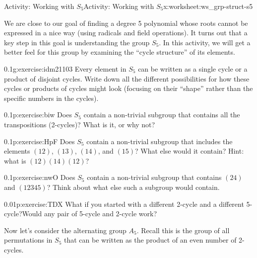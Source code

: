 \documentclass[11pt]{book}
\begin{document}
%
%
\typeout{************************************************}
\typeout{************************************************}
%
\begin{worksheet-subsection}{Activity: Working with \(S_5\)}{}{Activity: Working with \(S_5\)}{}{}{x:worksheet:ws_grp-struct-s5}
\begin{introduction}{}%
We are close to our goal of finding a degree 5 polynomial whose roots cannot be expressed in a nice way (using radicals and field operations).  It turns out that a key step in this goal is understanding the group \(S_5\).  In this activity, we will get a better feel for this group by examining the ``cycle structure'' of its elements.%
\end{introduction}%
\begin{divisionexercise}{1}{}{0.1}{g:exercise:idm21103}%
Every element in \(S_5\) can be written as a single cycle or a product of disjoint cycles.  Write down all the different possibilities for how these cycles or products of cycles might look (focusing on their ``shape'' rather than the specific numbers in the cycles).%
\end{divisionexercise}%
\begin{divisionexercise}{2}{}{0.1}{p:exercise:biw}%
Does \(S_5\) contain a non-trivial subgroup that contains all the transpositions (2-cycles)?  What is it, or why not?%
\end{divisionexercise}%
\begin{divisionexercise}{3}{}{0.1}{p:exercise:HpF}%
Does \(S_5\) contain a non-trivial subgroup that includes the elements \((12)\), \((13)\), \((14)\), and \((15)\)?  What else would it contain?  Hint: what is \((12)(14)(12)\)?%
\end{divisionexercise}%
\begin{divisionexercise}{4}{}{0.1}{p:exercise:nwO}%
Does \(S_5\) contain a non-trivial subgroup that contains \((24) \) and \((12345)\)?  Think about what else such a subgroup would contain.%
\end{divisionexercise}%
\begin{divisionexercise}{5}{}{0.01}{p:exercise:TDX}%
What if you started with a different 2-cycle and a different 5-cycle?Would any pair of 5-cycle and 2-cycle work?%
\end{divisionexercise}%
\clearpage
Now let's consider the alternating group \(A_5\).  Recall this is the group of all permutations in \(S_5\) that can be written as the product of an even number of 2-cycles.%

\end{worksheet-subsection}
\end{document}

